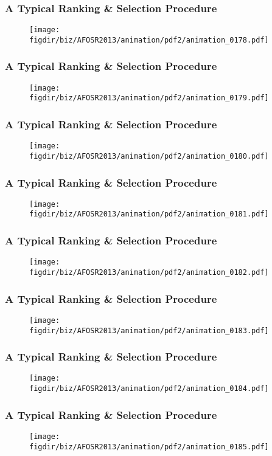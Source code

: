 \documentclass[13pt]{beamer}
\newcommand{\figdir}{../../fig}
\begin{document}
{\begin{frame}\frametitle{A Typical Ranking \& Selection Procedure}\begin{figure}\texttt{[image: \\figdir/biz/AFOSR2013/animation/pdf2/animation\_0178.pdf]}\end{figure}\end{frame}
\begin{frame}\frametitle{A Typical Ranking \& Selection Procedure}\begin{figure}\texttt{[image: \\figdir/biz/AFOSR2013/animation/pdf2/animation\_0179.pdf]}\end{figure}\end{frame}
\begin{frame}\frametitle{A Typical Ranking \& Selection Procedure}\begin{figure}\texttt{[image: \\figdir/biz/AFOSR2013/animation/pdf2/animation\_0180.pdf]}\end{figure}\end{frame}
\begin{frame}\frametitle{A Typical Ranking \& Selection Procedure}\begin{figure}\texttt{[image: \\figdir/biz/AFOSR2013/animation/pdf2/animation\_0181.pdf]}\end{figure}\end{frame}
\begin{frame}\frametitle{A Typical Ranking \& Selection Procedure}\begin{figure}\texttt{[image: \\figdir/biz/AFOSR2013/animation/pdf2/animation\_0182.pdf]}\end{figure}\end{frame}
\begin{frame}\frametitle{A Typical Ranking \& Selection Procedure}\begin{figure}\texttt{[image: \\figdir/biz/AFOSR2013/animation/pdf2/animation\_0183.pdf]}\end{figure}\end{frame}
\begin{frame}\frametitle{A Typical Ranking \& Selection Procedure}\begin{figure}\texttt{[image: \\figdir/biz/AFOSR2013/animation/pdf2/animation\_0184.pdf]}\end{figure}\end{frame}
\begin{frame}\frametitle{A Typical Ranking \& Selection Procedure}\begin{figure}\texttt{[image: \\figdir/biz/AFOSR2013/animation/pdf2/animation\_0185.pdf]}\end{figure}\end{frame}
}
\end{document}

